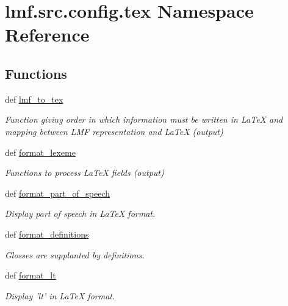 \hypertarget{namespacelmf_1_1src_1_1config_1_1tex}{\section{lmf.\+src.\+config.\+tex Namespace Reference}
\label{namespacelmf_1_1src_1_1config_1_1tex}
}
\subsection*{Functions}
\begin{DoxyCompactItemize}
\item 
def \hyperlink{namespacelmf_1_1src_1_1config_1_1tex_ac85ca206e865c9cc1d77b77c72a429d2}{lmf\+\_\+to\+\_\+tex}
\begin{DoxyCompactList}\small\item\em Function giving order in which information must be written in La\+Te\+X and mapping between L\+M\+F representation and La\+Te\+X (output) \end{DoxyCompactList}\item 
def \hyperlink{namespacelmf_1_1src_1_1config_1_1tex_ab5587986e20b08d8e30bc17b65bcecfb}{format\+\_\+lexeme}
\begin{DoxyCompactList}\small\item\em Functions to process La\+Te\+X fields (output) \end{DoxyCompactList}\item 
def \hyperlink{namespacelmf_1_1src_1_1config_1_1tex_a21aa2b6c6d989b66c340726e6069ff11}{format\+\_\+part\+\_\+of\+\_\+speech}
\begin{DoxyCompactList}\small\item\em Display part of speech in La\+Te\+X format. \end{DoxyCompactList}\item 
def \hyperlink{namespacelmf_1_1src_1_1config_1_1tex_a516cea03d4fd6b1d74a80405d78e0d4c}{format\+\_\+definitions}
\begin{DoxyCompactList}\small\item\em Glosses are supplanted by definitions. \end{DoxyCompactList}\item 
def \hyperlink{namespacelmf_1_1src_1_1config_1_1tex_ac87f28b4877c23268fba25f5e4e83c9d}{format\+\_\+lt}
\begin{DoxyCompactList}\small\item\em Display 'lt' in La\+Te\+X format. \end{DoxyCompactList}\item 

\end{DoxyCompactItemize}

